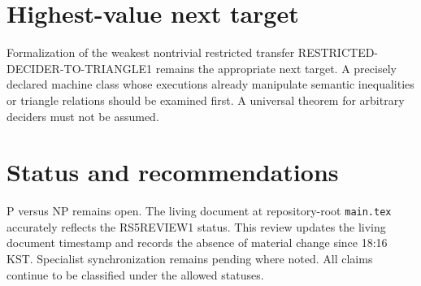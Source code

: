 \documentclass[11pt]{article}
\begin{document}
\section{Highest-value next target}
Formalization of the weakest nontrivial restricted transfer RESTRICTED-DECIDER-TO-TRIANGLE1 remains the appropriate next target. A precisely declared machine class whose executions already manipulate semantic inequalities or triangle relations should be examined first. A universal theorem for arbitrary deciders must not be assumed.

\section{Status and recommendations}
P versus NP remains open. The living document at repository-root \texttt{main.tex} accurately reflects the RS5REVIEW1 status. This review updates the living document timestamp and records the absence of material change since 18:16 KST. Specialist synchronization remains pending where noted. All claims continue to be classified under the allowed statuses.

\end{document}
